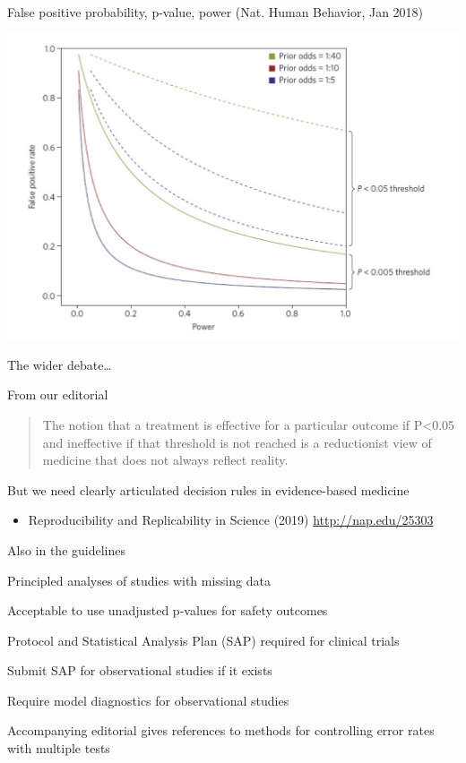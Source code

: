 \documentclass[ignorenonframetext,]{beamer}
\providecommand{\tightlist}{%
  \setlength{\itemsep}{0pt}\setlength{\parskip}{0pt}}
\begin{document}
\begin{frame}{False positive probability, p-value, power (Nat. Human
Behavior, Jan 2018)}
\protect\hypertarget{false-positive-probability-p-value-power-nat.-human-behavior-jan-2018-1}{}

\includegraphics[width=1\textwidth,height=\textheight]{../figures/ppv_threshold.jpeg}

\end{frame}

\begin{frame}{The wider debate\ldots{}}
\protect\hypertarget{the-wider-debate}{}

From our editorial

\begin{quote}
The notion that a treatment is effective for a particular outcome if P<0.05 and ineffective if that threshold is not reached is a reductionist view of medicine that does not always reflect reality.
\end{quote}

But we need clearly articulated decision rules in evidence-based
medicine

\begin{itemize}
\tightlist
\item
  Reproducibility and Replicability in Science (2019)
  \url{http://nap.edu/25303}
\end{itemize}

\end{frame}

\begin{frame}{Also in the guidelines}
\protect\hypertarget{also-in-the-guidelines}{}

Principled analyses of studies with missing data

Acceptable to use unadjusted p-values for safety outcomes

Protocol and Statistical Analysis Plan (SAP) required for clinical
trials

Submit SAP for observational studies if it exists

Require model diagnostics for observational studies

Accompanying editorial gives references to methods for controlling error
rates with multiple tests

\end{frame}
\end{document}
